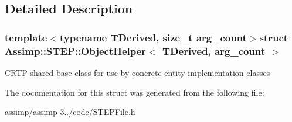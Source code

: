 \subsection{Detailed Description}
\subsubsection*{template$<$typename T\+Derived, size\+\_\+t arg\+\_\+count$>$struct Assimp\+::\+S\+T\+E\+P\+::\+Object\+Helper$<$ T\+Derived, arg\+\_\+count $>$}

C\+R\+T\+P shared base class for use by concrete entity implementation classes 

The documentation for this struct was generated from the following file\+:\begin{DoxyCompactItemize}
\item 
assimp/assimp-\/3../code/S\+T\+E\+P\+File.\+h\end{DoxyCompactItemize}
